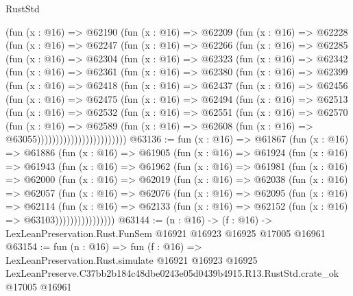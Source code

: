 \begin{lexlean}{RustStd}
\begin{coremodule}
    (fun (x : @16) =>
    @62190
      (fun (x : @16) =>
      @62209
        (fun (x : @16) =>
        @62228
          (fun (x : @16) =>
          @62247
            (fun (x : @16) =>
            @62266
              (fun (x : @16) =>
              @62285
                (fun (x : @16) =>
                @62304
                  (fun (x : @16) =>
                  @62323
                    (fun (x : @16) =>
                    @62342
                      (fun (x : @16) =>
                      @62361
                        (fun (x : @16) =>
                        @62380
                          (fun (x : @16) =>
                          @62399
                            (fun (x : @16) =>
                            @62418
                              (fun (x : @16) =>
                              @62437
                                (fun (x : @16) =>
                                @62456
                                  (fun (x : @16) =>
                                  @62475
                                    (fun (x : @16) =>
                                    @62494
                                      (fun (x : @16) =>
                                      @62513
                                        (fun (x : @16) =>
                                        @62532
                                          (fun (x : @16) =>
                                          @62551
                                            (fun (x : @16) =>
                                            @62570
                                              (fun (x : @16) =>
                                              @62589
                                                (fun (x : @16) =>
                                                @62608
                                                  (fun (x : @16) => @63055))))))))))))))))))))))))
@63136 := fun (x : @16) =>
  @61867
    (fun (x : @16) =>
    @61886
      (fun (x : @16) =>
      @61905
        (fun (x : @16) =>
        @61924
          (fun (x : @16) =>
          @61943
            (fun (x : @16) =>
            @61962
              (fun (x : @16) =>
              @61981
                (fun (x : @16) =>
                @62000
                  (fun (x : @16) =>
                  @62019
                    (fun (x : @16) =>
                    @62038
                      (fun (x : @16) =>
                      @62057
                        (fun (x : @16) =>
                        @62076
                          (fun (x : @16) =>
                          @62095
                            (fun (x : @16) =>
                            @62114
                              (fun (x : @16) =>
                              @62133
                                (fun (x : @16) => @62152 (fun (x : @16) => @63103))))))))))))))))
@63144 := (n : @16) ->
  (f : @16) -> LexLeanPreservation.Rust.FunSem @16921 @16923 @16925 @17005 @16961
@63154 := fun (n : @16) =>
  fun (f : @16) =>
  LexLeanPreservation.Rust.simulate
    @16921
    @16923
    @16925
    LexLeanPreserve.C37bb2b184c48dbe0243e05d0439b4915.R13.RustStd.crate_ok
    @17005
    @16961
\end{coremodule}
\end{lexlean}
